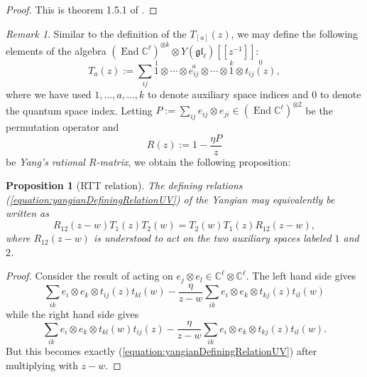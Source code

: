 \documentclass[11pt]{report}
\newtheorem{prop}[theorem]{Proposition}
\theoremstyle{definition}
\theoremstyle{remark}
\newtheorem*{remark}{Remark}
\theoremstyle{remark}
\newcommand{\End}{\operatorname{End}}
\newcommand{\C}{\mathbb{C}}
\begin{document}
\begin{proof}
This is theorem 1.5.1 of \cite{book:molev}.
\end{proof}

\begin{remark}
Similar to the definition of the $T_{[a]}(z)$, we may define the following elements of the algebra $(\End \C^\ell)^{\otimes k} \otimes Y(\mathfrak{gl}_\ell)[[z^{-1}]]$:
\begin{equation*}
T_a(z) := \sum_{ij} \overset{1}{1} \otimes \cdots \otimes \overset{a}{e_{ij}} \otimes \cdots \otimes \overset{k}{1} \otimes \overset{0}{t_{ij}(z)},
\end{equation*}
where we have used $1,...,a,...,k$ to denote auxiliary space indices and $0$ to denote the quantum space index. Letting $P := \sum_{ij} e_{ij} \otimes e_{ji} \in (\End \C^\ell)^{\otimes 2}$ be the permutation operator and
\begin{equation*}
R(z) := 1 - \frac{\eta P}{z}
\end{equation*}
be \emph{Yang's rational $R$-matrix}, we obtain the following proposition:
\end{remark}

\begin{prop}[RTT relation]
The defining relations (\ref{equation:yangianDefiningRelationUV}) of the Yangian may equivalently be written as
\begin{equation}\label{equation:RTTRelation}
R_{12}(z-w) T_1(z) T_2(w) = T_2(w) T_1(z) R_{12}(z-w),
\end{equation}
where $R_{12}(z-w)$ is understood to act on the two auxiliary spaces labeled $1$ and $2$.
\end{prop}

\begin{proof}
Consider the result of acting on $e_j \otimes e_l \in \C^\ell \otimes \C^\ell$. The left hand side gives
\begin{equation*}
\sum_{ik} e_i \otimes e_k \otimes t_{ij}(z) t_{kl}(w) - \frac{\eta}{z-w} \sum_{ik} e_i \otimes e_k \otimes t_{kj}(z) t_{il}(w)
\end{equation*}
while the right hand side gives
\begin{equation*}
\sum_{ik} e_i \otimes e_k \otimes t_{kl}(w) t_{ij}(z) - \frac{\eta}{z-w} \sum_{ik} e_i \otimes e_k \otimes t_{kj}(z) t_{il}(w).
\end{equation*}
But this becomes exactly (\ref{equation:yangianDefiningRelationUV}) after multiplying with $z-w$.
\end{proof}
\end{document}

